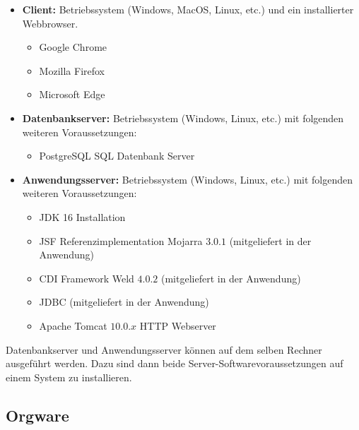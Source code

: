 \begin{itemize}

	\item \textbf{Client:} Betriebssystem (Windows, MacOS, Linux, etc.) und ein installierter Webbrowser.

	\begin{itemize}
		\item Google Chrome
		\item Mozilla Firefox
		\item Microsoft Edge
	\end{itemize}

	\item \textbf{Datenbankserver:} Betriebssystem (Windows, Linux, etc.) mit folgenden weiteren Voraussetzungen:

	\begin{itemize}
		\item PostgreSQL SQL Datenbank Server
	\end{itemize}

	\item \textbf{Anwendungsserver:} Betriebssystem (Windows, Linux, etc.) mit folgenden weiteren Voraussetzungen:

	\begin{itemize}
		\item JDK 16 Installation
		\item JSF Referenzimplementation Mojarra $3.0.1$ (mitgeliefert in der Anwendung)
		\item CDI Framework Weld $4.0.2$ (mitgeliefert in der Anwendung)
		\item JDBC (mitgeliefert in der Anwendung)
		\item Apache Tomcat $10.0.x$ HTTP Webserver
	\end{itemize}

\end{itemize}

	Datenbankserver und Anwendungsserver können auf dem selben Rechner ausgeführt werden. Dazu sind dann beide Server-Softwarevoraussetzungen auf einem System zu installieren.

\subsection{Orgware}

